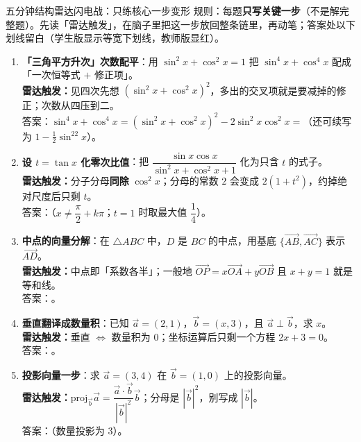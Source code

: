 \begin{warmupbox}{五分钟结构雷达闪电战：只练核心一步变形}
规则：每题\textbf{只写关键一步}（不是解完整题）。先读「雷达触发」，在脑子里把这一步放回整条链里，再动笔；答案处以下划线留白（学生版显示等宽下划线，教师版显红）。

\begin{enumerate}[label=(\arabic*), itemsep=5pt]
\item \textbf{「三角平方升次」次数配平}：用 $\sin^2x+\cos^2x=1$ 把 $\sin^4x+\cos^4x$ 配成「一次恒等式 $+$ 修正项」。\\
{\small\bfseries\textcolor{third}{雷达触发：}}见四次先想 $(\sin^2x+\cos^2x)^2$，多出的交叉项就是要减掉的修正；次数从四压到二。\\
答案：$\sin^4x+\cos^4x=(\sin^2x+\cos^2x)^2-2\sin^2x\cos^2x=$（还可续写为 $1-\tfrac12\sin^22x$）。

\item \textbf{设 $t=\tan x$ 化零次比值}：把 $\dfrac{\sin x\cos x}{\sin^2x+\cos^2x+1}$ 化为只含 $t$ 的式子。\\
{\small\bfseries\textcolor{third}{雷达触发：}}分子分母\textbf{同除} $\cos^2x$；分母的常数 $2$ 会变成 $2(1+t^2)$，约掉绝对尺度后只剩 $t$。\\
答案：（$x\neq\dfrac{\pi}2+k\pi$；$t=1$ 时取最大值 $\dfrac14$）。

\item \textbf{中点的向量分解}：在 $\triangle ABC$ 中，$D$ 是 $BC$ 的中点，用基底 $\{\overrightarrow{AB},\overrightarrow{AC}\}$ 表示 $\overrightarrow{AD}$。\\
{\small\bfseries\textcolor{third}{雷达触发：}}中点即「系数各半」；一般地 $\overrightarrow{OP}=x\overrightarrow{OA}+y\overrightarrow{OB}$ 且 $x+y=1$ 就是等和线。\\
答案：。

\item \textbf{垂直翻译成数量积}：已知 $\vec a=(2,1)$，$\vec b=(x,3)$，且 $\vec a\perp\vec b$，求 $x$。\\
{\small\bfseries\textcolor{third}{雷达触发：}}垂直 $\iff$ 数量积为 $0$；坐标运算后只剩一个方程 $2x+3=0$。\\
答案：。

\item \textbf{投影向量一步}：求 $\vec a=(3,4)$ 在 $\vec b=(1,0)$ 上的投影向量。\\
{\small\bfseries\textcolor{third}{雷达触发：}}$\mathrm{proj}_{\vec b}\vec a=\dfrac{\vec a\cdot\vec b}{|\vec b|^2}\vec b$；分母是 $|\vec b|^2$，别写成 $|\vec b|$。\\
答案：（数量投影为 $3$）。


\end{enumerate}
\end{warmupbox}
